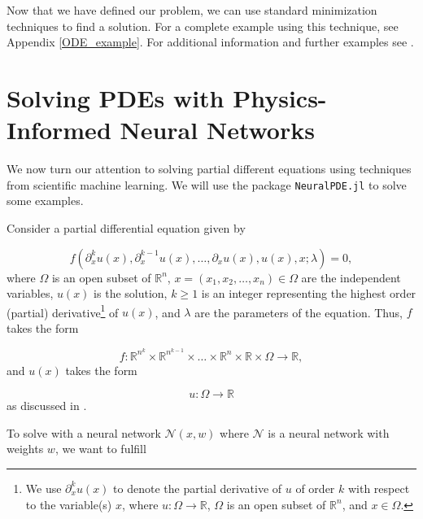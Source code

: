 \documentclass{CUP-JNL-DTM}%
\theoremstyle{definition}
\numberwithin{equation}{section}
\newcommand{\net}{\mathcal{N}}
\begin{document}
Now that we have defined our problem, we can use standard minimization techniques to find a solution. For a complete example using this technique, see Appendix \ref{ODE_example}. For additional information and further examples see \cite{rackauckasSciMLSciMLBookParallel}. 


\section{Solving PDEs with Physics-Informed Neural Networks}
\label{sec:PDE}

We now turn our attention to solving partial different equations using techniques from scientific machine learning. We will use the package \texttt{NeuralPDE.jl} \cite{zubovNeuralPDEAutomatingPhysicsInformed2021} to solve some examples. 

Consider a partial differential equation given by 

\begin{equation}
	f(\partial^k_xu(x), \partial^{k-1}_x u(x), \dots, \partial_x u(x), u(x), x; \lambda) = 0,
\end{equation}
where $\Omega$ is an open subset of $\mathbb{R}^n$, $x = (x_1, x_2, \dots, x_n) \in \Omega$ are the independent variables, $u(x)$ is the solution, $k \ge 1$ is an integer representing the highest order (partial) derivative\footnote{We use $\partial_x^k u(x)$ to denote the partial derivative of $u$ of order $k$ with respect to the variable(s) $x$, where $u\colon\Omega \rightarrow \mathbb{R}$, $\Omega$ is an open subset of $\mathbb{R}^n$, and $x \in \Omega$.} of $u(x)$, and $\lambda$ are the parameters of the equation. Thus, $f$ takes the form

\begin{equation}
    f\colon \mathbb{R}^{n^k} \times \mathbb{R}^{n^{k-1}} \times \dots \times \mathbb{R}^n \times \mathbb{R} \times \Omega \rightarrow \mathbb{R},
\end{equation}
and $u(x)$ takes the form

\begin{equation}
    u \colon \Omega \rightarrow \mathbb{R}
\end{equation}
as discussed in \cite{evansPartialDifferentialEquations2010}. 

To solve with a neural network $\net(x, w)$ where $\net$ is a neural network with weights $w$, we want to fulfill 
\end{document}
